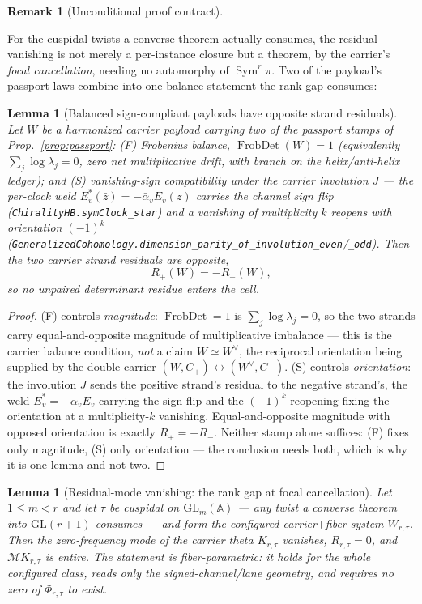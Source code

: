 \documentclass[11pt]{article}
\newtheorem{lemma}[theorem]{Lemma}
\theoremstyle{definition}
\newtheorem{remark}[theorem]{Remark}
\newcommand{\Sym}{\operatorname{Sym}}
\begin{document}
\begin{remark}[Unconditional proof contract]
\begin{enumerate}
For the cuspidal twists a converse theorem actually consumes, the residual vanishing is not merely a
per-instance closure but a theorem, by the carrier's \emph{focal cancellation}, needing no automorphy of
$\Sym^r\pi$. Two of the payload's passport laws combine into one balance statement the rank-gap consumes:

\begin{lemma}[Balanced sign-compliant payloads have opposite strand residuals]\label{lem:signcomp}
Let $W$ be a harmonized carrier payload carrying two of the passport stamps of
Prop.~\ref{prop:passport}: \textup{(F)} \emph{Frobenius balance}, $\operatorname{FrobDet}(W)=1$
(equivalently $\sum_j\log\lambda_j=0$, zero net multiplicative drift, with branch on the helix/anti-helix
ledger); and \textup{(S)} \emph{vanishing-sign compatibility} under the carrier involution $J$ --- the
per-clock weld $E_v^{*}(\bar z)=-\bar\alpha_v E_v(z)$ carries the channel sign flip
(\texttt{ChiralityHB.symClock\_star}) and a vanishing of multiplicity $k$ reopens with orientation $(-1)^k$
(\texttt{GeneralizedCohomology.dimension\_parity\_of\_involution\_even}/\texttt{\_odd}). Then the two carrier
strand residuals are opposite,
\[
  R_+(W)=-R_-(W),
\]
so no unpaired determinant residue enters the cell.
\end{lemma}

\begin{proof}
\textup{(F)} controls \emph{magnitude}: $\operatorname{FrobDet}=1$ is $\sum_j\log\lambda_j=0$, so the two
strands carry equal-and-opposite magnitude of multiplicative imbalance --- this is the carrier balance
condition, \emph{not} a claim $W\simeq W^\vee$, the reciprocal orientation being supplied by the double
carrier $(W,C_+)\leftrightarrow(W^\vee,C_-)$. \textup{(S)} controls \emph{orientation}: the involution $J$
sends the positive strand's residual to the negative strand's, the weld $E_v^{*}=-\bar\alpha_v E_v$ carrying
the sign flip and the $(-1)^k$ reopening fixing the orientation at a multiplicity-$k$ vanishing. Equal-and-opposite magnitude with opposed orientation is exactly $R_+=-R_-$. Neither stamp alone suffices: (F) fixes
only magnitude, (S) only orientation --- the conclusion needs both, which is why it is one lemma and not two.
\end{proof}

\begin{lemma}[Residual-mode vanishing: the rank gap at focal cancellation]\label{lem:rankgap}
Let $1\le m<r$ and let $\tau$ be cuspidal on $\mathrm{GL}_m(\mathbb A)$ --- any twist a converse theorem
into $\mathrm{GL}(r+1)$ consumes --- and form the configured carrier$+$fiber system $W_{r,\tau}$. Then the
zero-frequency mode of the carrier theta $K_{r,\tau}$ vanishes, $R_{r,\tau}=0$, and
$\mathcal M K_{r,\tau}$ is entire. The statement is \emph{fiber-parametric}: it holds for the whole
configured class, reads only the signed-channel/lane geometry, and requires no zero of $\Phi_{r,\tau}$ to
exist.
\end{lemma}


\end{enumerate}
\end{remark}
\end{document}
